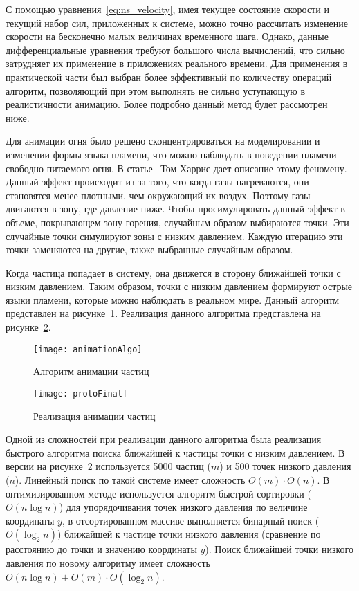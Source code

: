 С помощью уравнения~\ref{eq:ns_velocity}, имея текущее состояние скорости и
текущий набор сил, приложенных к системе, можно точно рассчитать изменение
скорости на бесконечно малых величинах временного шага. Однако, данные
дифференциальные уравнения требуют большого числа вычислений, что сильно
затрудняет их применение в приложениях реального времени. Для применения в
практической части был выбран более эффективный по количеству операций алгоритм,
позволяющий при этом выполнять не сильно уступающую в реалистичности анимацию.
Более подробно данный метод будет рассмотрен ниже.

Для анимации огня было решено сконцентрироваться на моделировании и изменении
формы языка пламени, что можно наблюдать в поведении пламени свободно питаемого
огня. В статье~\cite{Harris} Том Харрис дает описание этому феномену. Данный
эффект происходит из-за того, что когда газы нагреваются, они становятся менее
плотными, чем окружающий их воздух. Поэтому газы двигаются в зону, где давление
ниже. Чтобы просимулировать данный эффект в объеме, покрывающем зону горения,
случайным образом выбираются точки. Эти случайные точки симулируют зоны с низким
давлением. Каждую итерацию эти точки заменяются на другие, также выбранные
случайным образом.

Когда частица попадает в систему, она движется в сторону ближайшей точки с
низким давлением. Таким образом, точки с низким давлением формируют острые языки
пламени, которые можно наблюдать в реальном мире. Данный алгоритм представлен на
рисунке~\ref{fig:animationAlgo}. Реализация данного алгоритма представлена на
рисунке~\ref{fig:protoFinal}.
\begin{figure}[htb]
	\centering
    \texttt{[image: animationAlgo]}
    \caption{Алгоритм анимации частиц}%
    \label{fig:animationAlgo}
\end{figure}
\begin{figure}[htb]
	\centering
    \texttt{[image: protoFinal]}
    \caption{Реализация анимации частиц}%
    \label{fig:protoFinal}
\end{figure}

Одной из сложностей при реализации данного алгоритма была реализация быстрого
алгоритма поиска ближайшей к частицы точки с низким давлением. В версии на
рисунке~\ref{fig:protoFinal} используется 5000 частиц ($m$) и 500 точек низкого
давления ($n$). Линейный поиск по такой системе имеет сложность
$O(m) \cdot O(n)$.
В оптимизированном методе используется алгоритм быстрой сортировки
($O(n \log n)$) для упорядочивания точек низкого давления по величине
координаты $y$, в отсортированном массиве выполняется бинарный поиск
($O(\log_{2} n)$) ближайшей к частице точки низкого давления (сравнение по
расстоянию до точки и значению координаты $y$). Поиск ближайшей точки низкого
давления по новому алгоритму имеет сложность
$O(n \log n) + O(m) \cdot O(\log_{2} n)$.

